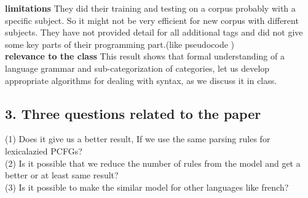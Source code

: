 \documentclass[10pt]{article}
\begin{document}
\textbf{limitations} They did their training and testing on a corpus probably with a specific subject. So it might not be very efficient for new corpus with different subjects. They have not provided detail for all additional tags and did not give some key parts of their programming part.(like pseudocode )\\
\textbf{relevance to the class} This result shows that formal understanding of a language grammar and sub-categorization of categories, let us develop appropriate algorithms for dealing with syntax, as we discuss it in class.


\subsection*{3. Three questions related to the paper}
(1) Does it give us a better result, If we use the same parsing rules for lexicalazied PCFGs? \\

(2) Is it possible that we reduce the number of rules from the model and get a better or at least same result?\\

(3) Is it possible to make the similar model for other languages like french?\\
\end{document}
